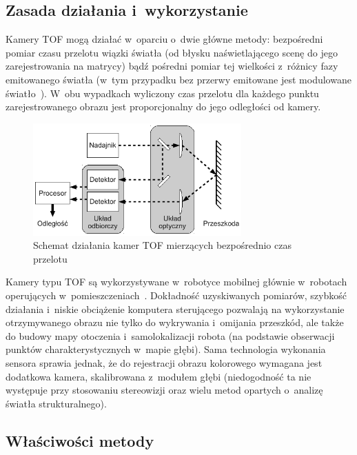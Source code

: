 \subsection{Zasada działania i~wykorzystanie}

Kamery TOF mogą działać w~oparciu o~dwie główne metody: bezpośredni pomiar
czasu przelotu wiązki światła (od błysku naświetlającego scenę do jego
zarejestrowania na matrycy) bądź pośredni pomiar tej wielkości z~różnicy fazy
emitowanego światła (w~tym przypadku bez przerwy emitowane jest modulowane
światło~\cite{910448}). W~obu wypadkach wyliczony czas przelotu dla każdego
punktu zarejestrowanego obrazu jest proporcjonalny do jego odległości od kamery.

\begin{figure}[h!]
\centering
\includegraphics[width=8cm]{../../Common/img/tof}
\caption{Schemat działania kamer TOF mierzących bezpośrednio czas przelotu}
\label{fig:tof}
\end{figure}

Kamery typu TOF są wykorzystywane w~robotyce mobilnej głównie w~robotach
operujących w~pomieszczeniach~\cite{Prusak:2008:PEM:1462089.1462102}. Dokładność
uzyskiwanych pomiarów, szybkość działania i~niskie obciążenie komputera
sterującego pozwalają na wykorzystanie otrzymywanego obrazu nie tylko do
wykrywania i~omijania przeszkód, ale także do budowy mapy otoczenia 
i~samolokalizacji robota (na podstawie obserwacji punktów charakterystycznych 
w~mapie głębi). Sama technologia wykonania sensora sprawia jednak, że do
rejestracji obrazu kolorowego wymagana jest dodatkowa kamera, skalibrowana 
z~modułem głębi (niedogodność ta nie występuje przy stosowaniu stereowizji oraz
wielu metod opartych o~analizę światła strukturalnego).

\subsection{Właściwości metody}

